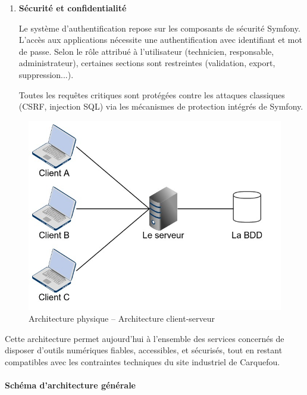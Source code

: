 \documentclass[11pt,a4paper]{article}
\begin{document}
\begin{enumerate}
\item \textbf{ Sécurité et confidentialité}

Le système d’authentification repose sur les composants de sécurité Symfony. L’accès aux applications nécessite une authentification avec identifiant et mot de passe. Selon le rôle attribué à l’utilisateur (technicien, responsable, administrateur), certaines sections sont restreintes (validation, export, suppression...).

Toutes les requêtes critiques sont protégées contre les attaques classiques (CSRF, injection SQL) via les mécanismes de protection intégrés de Symfony.


\end{enumerate}

\vspace{1em}

\begin{figure}[H]
    \centering
    \includegraphics[scale=0.45]{../Images/ClientServeur.jpeg} %
    \caption{Architecture physique – Architecture client-serveur}
    \label{fig:architecture_physique}
\end{figure}

Cette architecture permet aujourd’hui à l’ensemble des services concernés de disposer d’outils numériques fiables, accessibles, et sécurisés, tout en restant compatibles avec les contraintes techniques du site industriel de Carquefou.

\paragraph{Schéma d’architecture générale}
\end{document}
